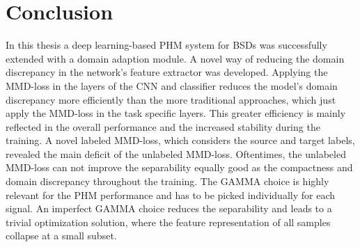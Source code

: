 \chapter{Conclusion}\label{chapter:conclusion}
In this thesis a deep learning-based PHM system for BSDs was successfully extended with a domain adaption module. A novel way of reducing the domain discrepancy in the network's feature extractor was developed. Applying the MMD-loss in the layers of the CNN and classifier reduces the model's domain discrepancy more efficiently than the more traditional approaches, which just apply the MMD-loss in the task specific layers. This greater efficiency is mainly reflected in the overall performance and the increased stability during the training. A novel labeled MMD-loss, which considers the source and target labels, revealed the main deficit of the unlabeled MMD-loss. Oftentimes, the unlabeled MMD-loss can not improve the separability equally good as the compactness and domain discrepancy throughout the training. The GAMMA choice is highly relevant for the PHM performance and has to be picked individually for each signal. An imperfect GAMMA choice reduces the separability and leads to a trivial optimization solution, where the feature representation of all samples collapse at a small subset. 
